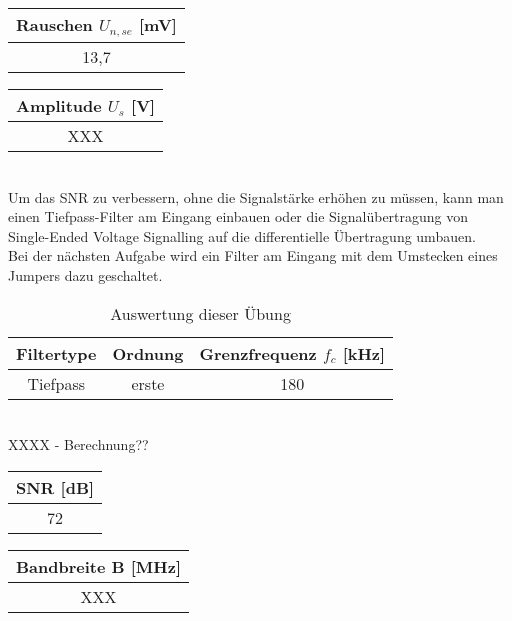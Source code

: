 \begin{table}[!h]
	\centering
	\begin{tabular}{|c|}
		\hline 
		Rauschen $U_{n, se}$ [mV]		\\ 
		\hline 
		13,7	\\ 
		\hline 
	\end{tabular}
\end{table}

\begin{table}[!h]
	\centering
	\begin{tabular}{|c|}
		\hline 
		Amplitude $U_s$ [V]		\\ 
		\hline 
		XXX		\\ 
		\hline 
	\end{tabular}
\end{table}
~\\
Um das SNR zu verbessern, ohne die Signalstärke erhöhen zu müssen, kann man einen Tiefpass-Filter am Eingang einbauen oder die Signalübertragung von Single-Ended Voltage Signalling auf die differentielle Übertragung umbauen.
~\\
Bei der nächsten Aufgabe wird ein Filter am Eingang mit dem Umstecken eines Jumpers dazu geschaltet.

\begin{table}[!h]
	\centering
	\begin{tabular}{|c|c|c|}
	\hline 
	Filtertype	& Ordnung		& Grenzfrequenz $f_c$ [kHz]		\\ 
	\hline 
	Tiefpass	& erste		& 180					\\ 
	\hline 
	\end{tabular}
	\caption{Auswertung dieser Übung}
\end{table}
~\\
XXXX - Berechnung??
\begin{table}[!h]
	\centering
	\begin{tabular}{|c|}
		\hline 
		SNR [dB]		\\ 
		\hline 
		72		\\ 
		\hline 
	\end{tabular}
\end{table}

\begin{table}[!h]
	\centering
	\begin{tabular}{|c|}
		\hline 
		Bandbreite B [MHz]		\\ 
		\hline 
		XXX		\\ 
		\hline 
	\end{tabular}
\end{table}



